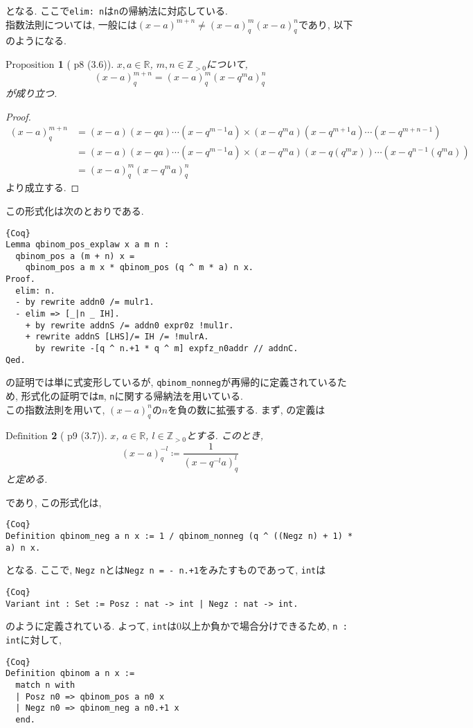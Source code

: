 \documentclass[11pt]{jarticle}
\theoremstyle{mystyle}
\newtheorem{df}{$\textrm{Definition}$}[subsubsection]
\newtheorem{prop}[df]{$\textrm{Proposition}$}
\newcommand{\bdf}{\begin{shadebox} \begin{df}}
\newcommand{\edf}{\end{df} \end{shadebox}}
\newcommand{\bprop}{\begin{shadebox} \begin{prop}}
\newcommand{\eprop}{\end{prop} \end{shadebox}}
\newcommand{\bpf}{\begin{proof}}
\newcommand{\epf}{\end{proof}}
\newcommand{\Z}{\mathbb{Z}}
\newcommand{\R}{\mathbb{R}}
\newcommand{\0}{\textbf{0}}
\newcommand{\1}{\textbf{1}}
\newcommand{\2}{\textbf{2}}
\begin{document}
となる. ここで{\tt elim:\,n}は{\tt n}の帰納法に対応している. \\
指数法則については, 一般には$(x - a)^{m + n} \neq (x - a)^m_q(x - a)^n_q$であり, 以下のようになる. 
\bprop[\cite{Kac} p8 (3.6)] \label{q_exp_low}
  $x,a\in\R$, $m,n\in\Z_{>0}$について, 
  \[
    (x-a)^{m+n}_q = (x-a)^m_q (x-q^ma)^n_q
  \]
  が成り立つ. 
\eprop
\bpf
  \begin{align*}
    (x-a)^{m+n}_q &= (x-a)(x-qa)\cdots(x-q^{m-1}a)
                         \times (x-q^ma)(x-q^{m+1}a)\cdots(x-q^{m+n-1})\\
                       &= (x-a)(x-qa)\cdots(x-q^{m-1}a)
                         \times (x-q^ma)(x-q(q^mx))\cdots(x-q^{n-1}(q^ma))\\
                       &= (x-a)^m_q(x-q^ma)^{n}_q
  \end{align*}
  より成立する.
\epf
この形式化は次のとおりである. 
\begin{lstlisting}{Coq}
Lemma qbinom_pos_explaw x a m n :
  qbinom_pos a (m + n) x =
    qbinom_pos a m x * qbinom_pos (q ^ m * a) n x.
Proof.
  elim: n.
  - by rewrite addn0 /= mulr1.
  - elim => [_|n _ IH].
    + by rewrite addnS /= addn0 expr0z !mul1r.
    + rewrite addnS [LHS]/= IH /= !mulrA.
      by rewrite -[q ^ n.+1 * q ^ m] expfz_n0addr // addnC.
Qed.
\end{lstlisting}
\cite{Kac}の証明では単に式変形しているが, {\tt qbinom\_nonneg}が再帰的に定義されているため, 形式化の証明では{\tt m}, {\tt n}に関する帰納法を用いている. \\
この指数法則を用いて, $(x - a)^n_q$の$n$を負の数に拡張する. まず, \cite{Kac}の定義は
\bdf[\cite{Kac} p9 (3.7)] \label{qbinom_neg}
  $x$, $a \in \R$, $l\in\Z_{>0}$とする. このとき, 
  \[
    (x-a)^{-l}_q \coloneqq \frac{1}{(x-q^{-l}a)^l_q}
  \]
  と定める. 
\edf
であり, この形式化は, 
\begin{lstlisting}{Coq}
Definition qbinom_neg a n x := 1 / qbinom_nonneg (q ^ ((Negz n) + 1) * a) n x.
\end{lstlisting}
となる. ここで, {\tt Negz n}とは{\tt Negz n = - n.+1}をみたすものであって, {\tt int}は
\begin{lstlisting}{Coq}
Variant int : Set := Posz : nat -> int | Negz : nat -> int.
\end{lstlisting}
のように定義されている. よって, {\tt int}は$0$以上か負かで場合分けできるため, {\tt n :\,int}に対して, 
\begin{lstlisting}{Coq}
Definition qbinom a n x :=
  match n with
  | Posz n0 => qbinom_pos a n0 x
  | Negz n0 => qbinom_neg a n0.+1 x
  end.
\end{lstlisting}
\end{document}
